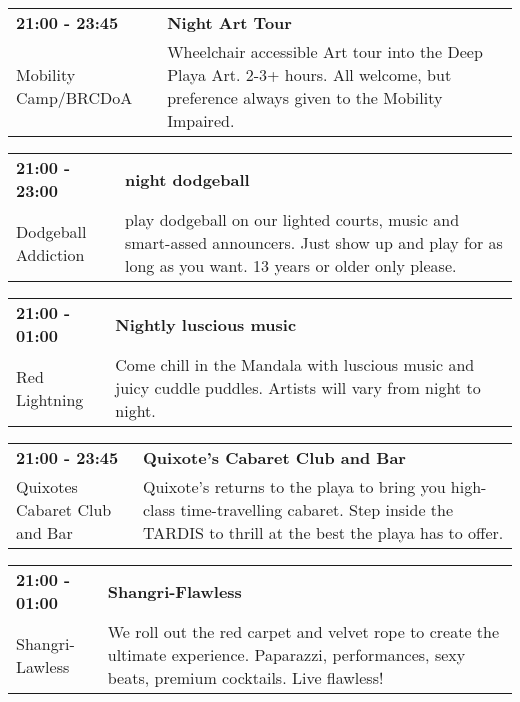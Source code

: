 \begin{tabular}{ p{1in} p{2.2in} }
    \textbf{21:00 - 23:45} & \textbf{Night Art Tour} \\
    Mobility Camp/BRCDoA \newline  & Wheelchair accessible Art tour into the Deep Playa Art.
2-3+ hours. All welcome, but preference always given to the Mobility Impaired. \\
    \hline 
\end{tabular}
    
\begin{tabular}{ p{1in} p{2.2in} }
    \textbf{21:00 - 23:00} & \textbf{night dodgeball} \\
    Dodgeball Addiction \newline  & play dodgeball on our lighted courts, music and smart-assed announcers. Just show up and play for as long as you want. 13 years or older only please. \\
    \hline 
\end{tabular}
    
\begin{tabular}{ p{1in} p{2.2in} }
    \textbf{21:00 - 01:00} & \textbf{Nightly luscious music} \\
    Red Lightning \newline  & Come chill in the Mandala with luscious music and juicy cuddle puddles. Artists will vary from night to night. \\
    \hline 
\end{tabular}
    
\begin{tabular}{ p{1in} p{2.2in} }
    \textbf{21:00 - 23:45} & \textbf{Quixote's Cabaret Club and Bar } \\
    Quixotes Cabaret Club and Bar \newline  & Quixote's returns to the playa to bring you high-class time-travelling cabaret. Step inside the TARDIS to thrill at the best the playa has to offer. \\
    \hline 
\end{tabular}
    
\begin{tabular}{ p{1in} p{2.2in} }
    \textbf{21:00 - 01:00} & \textbf{Shangri-Flawless} \\
    Shangri-Lawless \newline  & We roll out the red carpet and velvet rope to create the ultimate experience.  Paparazzi, performances, sexy beats, premium cocktails.  Live flawless! \\
    \hline 
\end{tabular}
    
